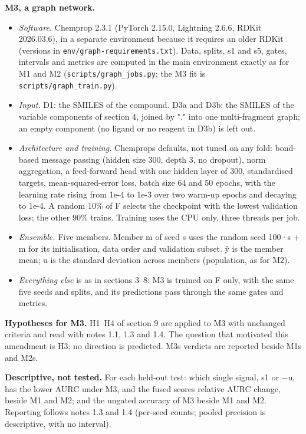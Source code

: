 \textbf{M3, a graph network.}

\begin{itemize}
\tightlist
\item
  \emph{Software.} Chemprop 2.3.1 (PyTorch 2.15.0, Lightning 2.6.6,
  RDKit 2026.03.6), in a separate environment because it requires an
  older RDKit (versions in \texttt{env/graph-requirements.txt}). Data,
  splits, s1 and s5, gates, intervals and metrics are computed in the
  main environment exactly as for M1 and M2
  (\texttt{scripts/graph\_jobs.py}; the M3 fit is
  \texttt{scripts/graph\_train.py}).
\item
  \emph{Input.} D1: the SMILES of the compound. D3a and D3b: the SMILES
  of the variable components of section 4, joined by "." into one
  multi-fragment graph; an empty component (no ligand or no reagent in
  D3b) is left out.
\item
  \emph{Architecture and training.} Chemprop\textquotesingle s defaults,
  not tuned on any fold: bond-based message passing (hidden size 300,
  depth 3, no dropout), norm aggregation, a feed-forward head with one
  hidden layer of 300, standardised targets, mean-squared-error loss,
  batch size 64 and 50 epochs, with the learning rate rising from 1e-4
  to 1e-3 over two warm-up epochs and decaying to 1e-4. A random 10\% of
  F selects the checkpoint with the lowest validation loss; the other
  90\% trains. Training uses the CPU only, three threads per job.
\item
  \emph{Ensemble.} Five members. Member m of seed s uses the random seed
  100·s + m for its initialisation, data order and validation subset. ŷ
  is the member mean; u is the standard deviation across members
  (population, as for M2).
\item
  \emph{Everything else} is as in sections 3--8: M3 is trained on F
  only, with the same five seeds and splits, and its predictions pass
  through the same gates and metrics.
\end{itemize}

\textbf{Hypotheses for M3.} H1--H4 of section 9 are applied to M3 with
unchanged criteria and read with notes 1.1, 1.3 and 1.4. The question
that motivated this amendment is H3; no direction is predicted.
M3\textquotesingle s verdicts are reported beside M1\textquotesingle s
and M2\textquotesingle s.

\textbf{Descriptive, not tested.} For each held-out test: which single
signal, s1 or −u, has the lower AURC under M3, and the fused
score\textquotesingle s relative AURC change, beside M1 and M2; and the
ungated accuracy of M3 beside M1 and M2. Reporting follows notes 1.3 and
1.4 (per-seed counts; pooled precision is descriptive, with no
interval).

